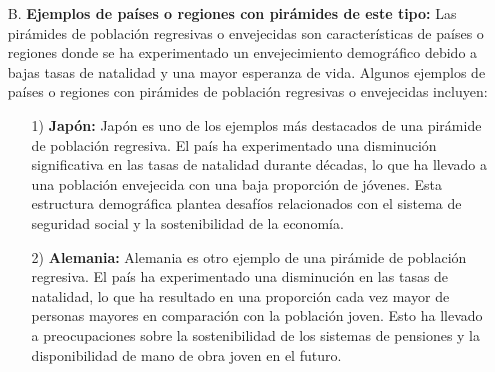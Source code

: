 \documentclass[8pt,a4paper]{beamer}
\begin{document}
{\begin{frame}{}
\begin{block}{}
\begin{enumerate}
\begin{itemize}
\item[\ding{65}] \textbf{Disminución de la fuerza laboral y los servicios sociales:} Con una base estrecha y una mayor proporción de personas mayores, las pirámides de población regresivas pueden indicar una disminución de la fuerza laboral y una mayor demanda de servicios sociales para la atención médica y el bienestar de las personas mayores. Esto puede tener implicaciones en la economía y la planificación de servicios sociales.
\end{itemize}
Las pirámides de población regresivas o envejecidas son características de las sociedades con bajas tasas de natalidad y una mayor esperanza de vida. Estas pirámides reflejan un cambio demográfico hacia una población más envejecida, lo que puede requerir políticas y programas específicos para abordar los desafíos y aprovechar las oportunidades asociadas con este envejecimiento demográfico.
\item[B.] \textbf{Ejemplos de países o regiones con pirámides de este tipo:} Las pirámides de población regresivas o envejecidas son características de países o regiones donde se ha experimentado un envejecimiento demográfico debido a bajas tasas de natalidad y una mayor esperanza de vida. Algunos ejemplos de países o regiones con pirámides de población regresivas o envejecidas incluyen:
\end{enumerate}
\end{block}
\end{frame}

\begin{frame}{}
\begin{block}{}
\justifying
\begin{enumerate}
\justifying
\item[{}]
\begin{enumerate}
\justifying
\item[1)] \textbf{Japón:} Japón es uno de los ejemplos más destacados de una pirámide de población regresiva. El país ha experimentado una disminución significativa en las tasas de natalidad durante décadas, lo que ha llevado a una población envejecida con una baja proporción de jóvenes. Esta estructura demográfica plantea desafíos relacionados con el sistema de seguridad social y la sostenibilidad de la economía.

\item[2)] \textbf{Alemania:} Alemania es otro ejemplo de una pirámide de población regresiva. El país ha experimentado una disminución en las tasas de natalidad, lo que ha resultado en una proporción cada vez mayor de personas mayores en comparación con la población joven. Esto ha llevado a preocupaciones sobre la sostenibilidad de los sistemas de pensiones y la disponibilidad de mano de obra joven en el futuro.


\end{enumerate}
\end{enumerate}
\end{block}
\end{frame}}
\end{document}
